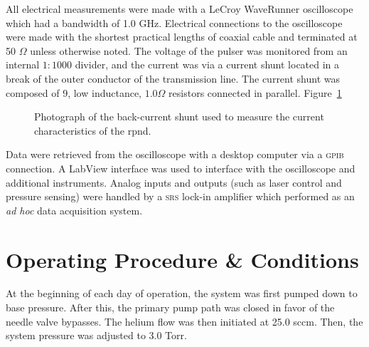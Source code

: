 All electrical measurements were made with a LeCroy  WaveRunner
oscilloscope which had a bandwidth of 1.0 GHz. Electrical connections to the
oscilloscope were made with the shortest practical lengths of 
coaxial cable and terminated at 50 $\Omega$ unless otherwise noted. The voltage
of the pulser was monitored from an internal $1:1000$ divider, and the current
was via a current shunt located in a break of the outer conductor of the
transmission line. The current shunt was composed of 9, low inductance, $1.0
\Omega$ resistors connected in parallel. Figure~\ref{fig:bcs}
\begin{figure}
  \centering
  \setlength\fboxsep{0pt}
  \setlength\fboxrule{1.0pt}
  \caption{Photograph of the back-current shunt used to measure the current
  characteristics of the \acs{rpnd}.}
  \label{fig:bcs}
\end{figure}

Data were retrieved from the oscilloscope with a desktop computer via a
\textsc{gpib} connection. A LabView interface was used to interface with the
oscilloscope and additional instruments. Analog inputs and outputs (such as
laser control and pressure sensing) were handled by a \textsc{srs}
 lock-in amplifier which performed as an \emph{ad hoc} data
acquisition system.

\section{Operating Procedure \& Conditions}

At the beginning of each day of operation, the system was first pumped down to
base pressure. After this, the primary pump path was closed in favor of the
needle valve bypasses. The helium flow was then initiated at 25.0 sccm. Then,
the system pressure was adjusted to 3.0 Torr.

